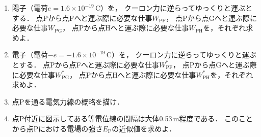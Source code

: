 \documentclass[fleqn,head_space=14mm,foot_space=15mm,gutter=10mm,fore_edge=10mm,
    twocolumn,jafontscale=0.92]{jlreq}
\begin{document}
\begin{enumerate}
    
    \item 陽子（電荷$e=1.6 \times 10^{-19}$\,C）を，
    クーロン力に逆らってゆっくりと運ぶとする．
    点Pから点Fへと運ぶ際に必要な仕事$W_\text{PF}$，
    点Pから点Gへと運ぶ際に必要な仕事$W_\text{PG}$，
    点Pから点Hへと運ぶ際に必要な仕事$W_\text{PH}$を，それぞれ求めよ．

    \item 電子（電荷$-e=-1.6 \times 10^{-19}$\,C）を，
    クーロン力に逆らってゆっくりと運ぶとする．
    点Pから点Fへと運ぶ際に必要な仕事$W^*_\text{PF}$，
    点Pから点Gへと運ぶ際に必要な仕事$W^*_\text{PG}$，
    点Pから点Hへと運ぶ際に必要な仕事$W^*_\text{PH}$を，それぞれ求めよ．

    \item 点Pを通る電気力線の概略を描け．
    
    \item 点P付近に図示してある等電位線の間隔は大体0.53\,m程度である．
    このことから点Pにおける電場の強さ$E_\text{P}$の近似値を求めよ．

\end{enumerate}

\vspace{4pt}
\end{document}

